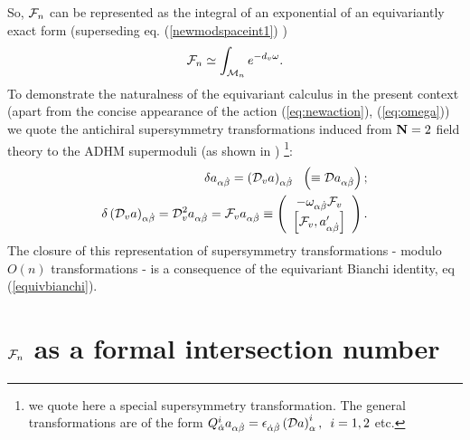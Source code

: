 \documentclass[a4paper,12pt]{article}
\begin{document}
So, ${\cal F}_n$ can be represented as the integral of an 
exponential of an equivariantly exact form (superseding eq. 
(\ref{newmodspaceint1}) ) 
\begin{equation}
{\cal F}_n
\simeq \int_{{\cal M}_n} e^{-d_v\omega}.
\label{newmodspaceint2}
\end{equation}  
To demonstrate the naturalness of the equivariant calculus in 
the present context (apart from the concise appearance of the 
action (\ref{eq:newaction}), (\ref{eq:omega})) we quote the 
antichiral supersymmetry transformations induced from ${\bf N}=2$ 
field theory  to the ADHM supermoduli (as shown in \cite{dorey2})
\footnote{we quote here a special supersymmetry transformation. 
The general transformations are of the form $Q^i_{\dot{\alpha}}
a_{\alpha \dot{\beta}} =\epsilon_{\dot{\alpha}\dot{\beta}}
\left({\cal D}a\right)^i_{\alpha}
, \, \, \, i=1,2$ etc.}: 
\begin{eqnarray}
\delta a_{\alpha \dot{\beta}}=\left({\cal D}_v a\right)_{\alpha \dot{\beta}} 
\, \, \, \, \left(\equiv {\cal D} a_{\alpha \dot{\beta}}\right); 
\nonumber \\
\delta \left({\cal D}_v a\right)_{\alpha \dot{\beta}}= 
{\cal D}_v^2 a_{\alpha \dot{\beta}}= {\cal F}_v a_{\alpha \dot{\beta}} 
\equiv 
\left(
\begin{array}{c}
-\omega_{\alpha \dot{\beta}} {\cal F}_v \\
\left[{\cal F}_v,a'_{\alpha \dot{\beta}} \right] 
\end{array}
\right).
\end{eqnarray}
The closure of this representation of supersymmetry transformations - 
modulo $O(n)$ transformations - is a consequence of the equivariant 
Bianchi identity, eq (\ref{equivbianchi}).  
                                
\section{${\cal F}_n$ as a formal intersection number}\label{sec:IV}
\end{document}
